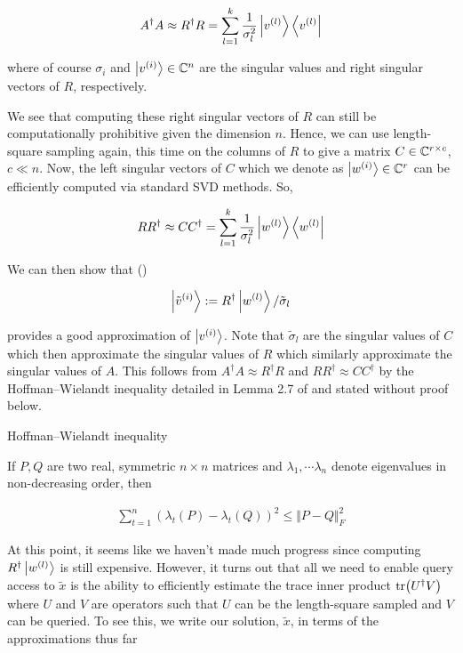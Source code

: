 \documentclass[main.tex]{subfiles}
\begin{document}
\begin{align*}
A^\dag A \approx R^\dag R = \sum_{l=1}^k \frac{1}{\sigma_l^2}\ket{v^{(l)}}\bra{v^{(l)}}
\end{align*}

where of course $\sigma_i$ and $\ket{v^{(i)}} \in \mathbb{C}^n$ are the singular values and right singular vectors of $R$, respectively.

We see that computing these right singular vectors of $R$ can still be computationally prohibitive given the dimension $n$. Hence, we can use length-square sampling again, this time on the columns of $R$ to give a matrix $C \in \mathbb{C}^{r \times c}$, $c \ll n$. Now, the left singular vectors of $C$ which we denote as $\ket{w^{(i)}} \in \mathbb{C}^r$ can be efficiently computed via standard SVD methods. So,

\begin{align*}
RR^\dag \approx CC^\dag = \sum_{l=1}^k \frac{1}{\sigma_l^2}\ket{w^{(l)}}\bra{w^{(l)}}
\end{align*}


We can then show that ()

\begin{align}
\label{def:approx-right}
\ket{\tilde{v}^{(i)}} := R^\dag \ket{w^{(l)}} / \tilde{\sigma}_l
\end{align}

provides a good approximation of $\ket{v^{(i)}}$. Note that $\tilde{\sigma}_l$ are the singular values of $C$ which then approximate the singular values of $R$ which similarly approximate the singular values of $A$. This follows from $A^\dag A \approx R^\dag R$ and $RR^\dag \approx CC^\dag$ by the Hoffman--Wielandt inequality detailed in Lemma 2.7 of \cite{kannan2017randomized} and stated without proof below.

\begin{lemma}Hoffman--Wielandt inequality

	If $P, Q$ are two real, symmetric $n \times n$ matrices and $\lambda_1, \cdots \lambda_n$ denote eigenvalues in non-decreasing order, then
	
	\begin{align*}
		\sum_{t=1}^n(\lambda_t(P) - \lambda_t(Q))^2 \leq \Vert P - Q \Vert_F^2
	\end{align*}
\end{lemma}


At this point, it seems like we haven't made much progress since computing $R^\dag \ket{w^{(l)}}$ is still expensive. However, it turns out that all we need to enable query access to $\tilde{x}$ is the ability to efficiently estimate the trace inner product $\tr(U^\dag V)$ where $U$ and $V$ are operators such that $U$ can be the length-square sampled and $V$ can be queried. To see this, we write our solution, $\tilde{x}$, in terms of the approximations thus far
\end{document}
